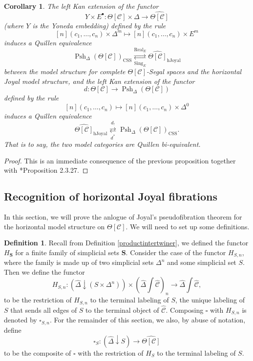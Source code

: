 \documentclass[a4paper]{article}
\numberwithin{equation}{subsection}
\theoremstyle{plain}   %
\newtheorem{cor}[equation]{Corollary}
\theoremstyle{definition}
\newtheorem{defn}[equation]{Definition}
\theoremstyle{remark}
\theoremstyle{plain}
\DeclareMathOperator{\Psh}{Psh}
\newcommand{\overcat}[2]{{\left(#1\downarrow #2\right)}}
\newcommand{\psh}[1]{\ensuremath{\widehat{#1}}}
\providecommand{\C}{}
\renewcommand{\C}{\ensuremath{\mathcal{C}}}
\newcommand{\cellset}{\ensuremath{\widehat{\Theta[\mathcal{C}]}}}
\newcommand{\ssetlab}{\ensuremath{\widehat{\Delta} \int \widehat{\mathcal{C}}}}
\begin{document}
\begin{cor}
	The left Kan extension of the functor \[Y \times E^\bullet:\Theta[\C]\times \Delta \to \cellset\] (where \(Y\) is the Yoneda embedding) defined by the rule 
	\[[n](c_1,\dots,c_n)\times \Delta^m \mapsto [n](c_1,\dots,c_n) \times E^m\]
	induces a Quillen equivalence
	\[\Psh_\Delta(\Theta[\C])_{\mathrm{CSS}} \underset{\operatorname{Sing}_E}{\overset{\operatorname{Real}_E}{\rightleftarrows}} \cellset_{\mathrm{hJoyal}}\]
	between the model structure for complete \(\Theta[\C]\)-Segal spaces and the horizontal Joyal model structure,
	and the left Kan extension of the functor 
	\[d:\Theta[\C] \to \Psh_\Delta(\Theta[\C])\]
	defined by the rule
	\[[n](c_1,\dots,c_n) \mapsto [n](c_1,\dots,c_n) \times \Delta^0\]
	induces a Quillen equivalence
	\[\cellset_{\mathrm{hJoyal}} \underset{d^\ast}{\overset{d_!}{\rightleftarrows}} \Psh_\Delta(\Theta[\C])_{\mathrm{CSS}}.\]
	That is to say, the two model categories are Quillen bi-equivalent.
\end{cor}
\begin{proof} This is an immediate consequence of the previous proposition together with \cite{cisinski-book}*{Proposition 2.3.27}.
\end{proof}

\subsection{Recognition of horizontal Joyal fibrations}\label{admissible}
In this section, we will prove the anlogue of Joyal's pseudofibration theorem for the horizontal model structure on \(\Theta[\C]\).  We will need to set up some definitions.

\begin{defn}
	Recall from Definition \ref{productintertwiner}, we defined the functor \(H_\mathbf{S}\) for a finite family of simplicial sets \(\mathbf{S}\).  Consider the case of the functor \(H_{S,n}\), where the family is made up of two simplicial sets \(\Delta^n\) and some simplicial set \(S\).  Then we define the functor 
	\[H_{S,n}: \overcat{\psh{\Delta}}{(S\times \Delta^n)} \times  \left(\ssetlab\right)_{n} \to \ssetlab,\]
	to be the restriction of \(H_{S,n}\) to the terminal labeling of \(S\), the unique labeling of \(S\) that sends all edges of \(S\) to the terminal object of \(\psh{\C}\).   Composing \(\square\) with \(H_{S,n}\) is denoted by \(\square_{S,n}\).  For the remainder of this section, we also, by abuse of notation, define 
	\[\square_S:\overcat{\psh{\Delta}}{S} \to \cellset\]
	to be the composite of \(\square\) with the restriction of \(H_S\) to the terminal labeling of \(S\).  
\end{defn}
\end{document}

